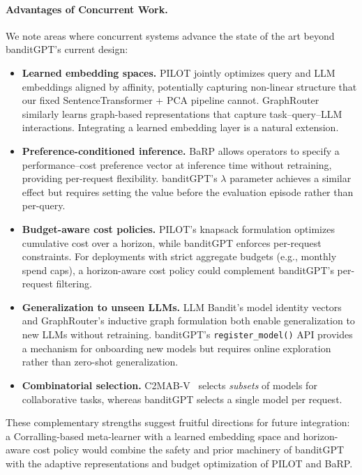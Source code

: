 
\paragraph{Advantages of Concurrent Work.}
We note areas where concurrent systems advance the state of the art beyond
banditGPT's current design:
\begin{itemize}[nosep]
  \item \textbf{Learned embedding spaces.}
    PILOT jointly optimizes query and LLM embeddings aligned by affinity,
    potentially capturing non-linear structure that our fixed
    SentenceTransformer + PCA pipeline cannot.
    GraphRouter~\cite{feng2025graphrouter} similarly learns graph-based
    representations that capture task--query--LLM interactions.
    Integrating a learned embedding layer is a natural extension.
  \item \textbf{Preference-conditioned inference.}
    BaRP allows operators to specify a performance--cost preference vector at
    inference time without retraining, providing per-request flexibility.
    banditGPT's $\lambda$ parameter achieves a similar effect but requires
    setting the value before the evaluation episode rather than per-query.
  \item \textbf{Budget-aware cost policies.}
    PILOT's knapsack formulation optimizes cumulative cost over a horizon,
    while banditGPT enforces per-request constraints.
    For deployments with strict aggregate budgets (e.g., monthly spend caps),
    a horizon-aware cost policy could complement banditGPT's per-request
    filtering.
  \item \textbf{Generalization to unseen LLMs.}
    LLM Bandit's model identity vectors and GraphRouter's inductive graph
    formulation both enable generalization to new LLMs without retraining.
    banditGPT's \texttt{register\_model()} API provides a mechanism for
    onboarding new models but requires online exploration rather than
    zero-shot generalization.
  \item \textbf{Combinatorial selection.}
    C2MAB-V~\cite{dai2024c2mab} selects \emph{subsets} of models for
    collaborative tasks, whereas banditGPT selects a single model per request.
\end{itemize}

These complementary strengths suggest fruitful directions for future
integration: a Corralling-based meta-learner with a learned embedding space
and horizon-aware cost policy would combine the safety and prior machinery
of banditGPT with the adaptive representations and budget optimization of
PILOT and BaRP.
